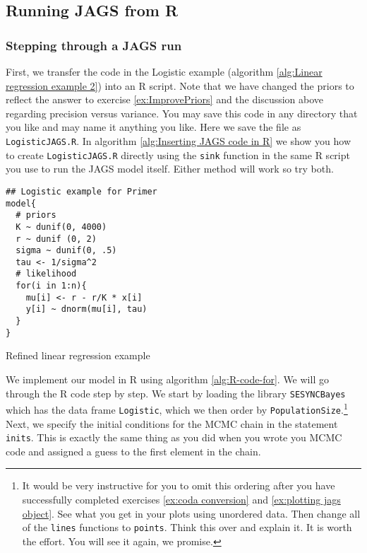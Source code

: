 \documentclass[12pt,english]{article}
\begin{document}
\subsection{Running JAGS from R}

\subsubsection{Stepping through a JAGS run} \label{sssec:Stepping through a JAGS run}

First, we transfer the code in the Logistic example (algorithm \ref{alg:Linear regression example 2}) into an R script. Note that we have changed the priors to reflect the answer to exercise \ref{ex:ImprovePriors} and the discussion above regarding precision versus variance. You may save this code in any directory that you like and may name it anything you like. Here we save the file as \texttt{LogisticJAGS.R}. In algorithm \ref{alg:Inserting JAGS code in R} we show you how to create \texttt{LogisticJAGS.R} directly using the \texttt{sink} function in the same R script you use to run the JAGS model itself. Either method will work so try both.

\begin{algorithm}
\begin{Verbatim}[frame=single]
## Logistic example for Primer
model{
  # priors
  K ~ dunif(0, 4000)
  r ~ dunif (0, 2)
  sigma ~ dunif(0, .5) 
  tau <- 1/sigma^2
  # likelihood
  for(i in 1:n){
    mu[i] <- r - r/K * x[i]
    y[i] ~ dnorm(mu[i], tau)
  }
}
\end{Verbatim}
\caption{Refined linear regression example}
\label{alg:Linear regression example 2}
\end{algorithm}

We implement our model in R using algorithm \ref{alg:R-code-for}. We will go through the R code step by step. We start by loading the library \texttt{SESYNCBayes} which has the data frame \texttt{Logistic}, which we then order by \texttt{PopulationSize}.\footnote{It would be very instructive for you to omit this ordering after you have successfully completed exercises \ref{ex:coda conversion} and \ref{ex:plotting jags object}. See what you get in your plots using unordered data. Then change all of the \texttt{lines} functions to \texttt{points}. Think this over and explain it. It is worth the effort. You will see it again, we promise.} Next, we specify the initial conditions for the MCMC chain in the statement \texttt{inits}. This is exactly the same thing as you did when you wrote you MCMC code and assigned a guess to the first element in the chain. 
\end{document}

